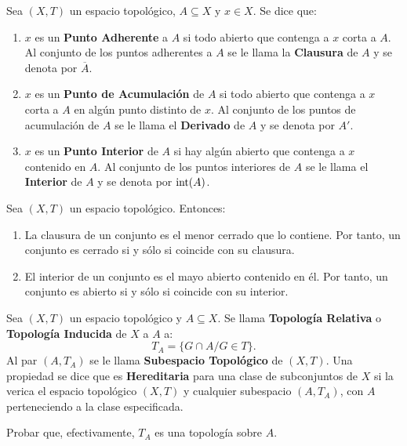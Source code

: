 \documentclass[cursovd_portada.tex]{subfiles}
\begin{document}
\begin{defi}
Sea $(X,T)$ un espacio topológico, $A\subseteq X$ y $x\in X$. Se dice que:
\begin{enumerate}
\item $x$ es un {\bf Punto Adherente} a $A$ si todo abierto que contenga a $x$ corta a $A$. Al conjunto de los
puntos adherentes a $A$ se le llama la {\bf Clausura} de $A$ y se denota por $\overline{A}$.
\item $x$ es un {\bf Punto de Acumulación} de $A$ si todo abierto que contenga a $x$ corta a $A$ en algún punto distinto
de $x$. Al conjunto de los puntos de acumulación de $A$ se le llama el {\bf Derivado} de $A$ y se denota por $A'$.
\item $x$ es un {\bf Punto Interior} de $A$ si hay algún abierto que contenga a $x$ contenido en $A$. Al conjunto de los
puntos interiores de $A$ se le llama el {\bf Interior} de $A$ y se denota por ${\rm int}(A)$.
\end{enumerate}
\end{defi}

\newpage

\begin{prop}
Sea $(X,T)$ un espacio topológico. Entonces:
\begin{enumerate}
\item La clausura de un conjunto es el menor cerrado que lo contiene. Por tanto, un conjunto es cerrado si y sólo
si coincide con su clausura.
\item El interior de un conjunto es el mayo abierto contenido en él. Por tanto, un conjunto es abierto si y sólo
si coincide con su interior.
\end{enumerate}
\end{prop}
\begin{defi}
Sea $(X,T)$ un espacio topológico y $A\subseteq X$. Se llama {\bf To\-po\-lo\-gía Relativa} o {\bf Topología
Inducida} de $X$ a $A$ a:
$$T_A=\{G\cap A/G\in T\}.$$
\hs Al par $(A,T_A)$ se le llama {\bf Subespacio Topológico} de $(X,T)$. Una propiedad se dice que es {\bf
Hereditaria} para una clase de subconjuntos de $X$ si la verica el espacio topológico $(X,T)$ y cualquier
subespacio $(A,T_A)$, con $A$ perteneciendo a la clase especificada.
\end{defi}
\begin{ejer}
{\rm Probar que, efectivamente, $T_A$ es una topología sobre $A$.}
\end{ejer}
\end{document}
